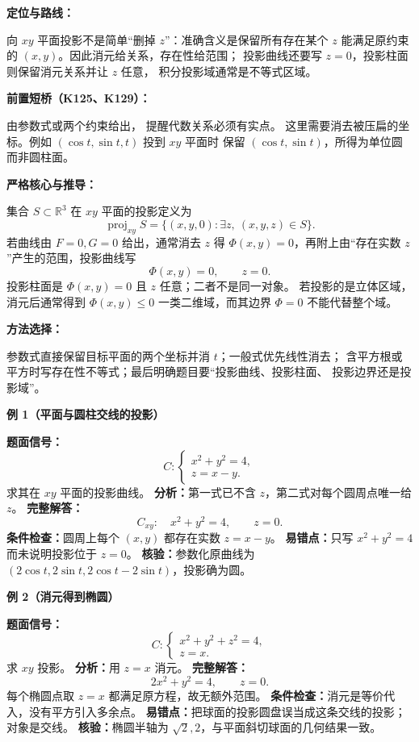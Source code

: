 \begin{knowledgeBox}
\textbf{定位与路线：}

向 \(xy\) 平面投影不是简单“删掉 \(z\)”：准确含义是保留所有存在某个
\(z\) 能满足原约束的 \((x,y)\)。因此消元给关系，存在性给范围；
投影曲线还要写 \(z=0\)，投影柱面则保留消元关系并让 \(z\) 任意，
积分投影域通常是不等式区域。

\textbf{前置短桥（K125、K129）：}

由参数式或两个约束给出，
提醒代数关系必须有实点。
这里需要消去被压扁的坐标。例如 \((\cos t,\sin t,t)\) 投到 \(xy\) 平面时
保留 \((\cos t,\sin t)\)，所得为单位圆而非圆柱面。

\textbf{严格核心与推导：}

集合 \(S\subset\mathbb R^3\) 在 \(xy\) 平面的投影定义为
\[
\operatorname{proj}_{xy}S
=\{(x,y,0):\exists z,\ (x,y,z)\in S\}.
\]
若曲线由 \(F=0,G=0\) 给出，通常消去 \(z\) 得
\(\Phi(x,y)=0\)，再附上由“存在实数 \(z\)”产生的范围，投影曲线写
\[
\Phi(x,y)=0,\qquad z=0.
\]
投影柱面是 \(\Phi(x,y)=0\) 且 \(z\) 任意；二者不是同一对象。
若投影的是立体区域，消元后通常得到
\(\Phi(x,y)\le0\) 一类二维域，而其边界 \(\Phi=0\) 不能代替整个域。

\textbf{方法选择：}

参数式直接保留目标平面的两个坐标并消 \(t\)；一般式优先线性消去；
含平方根或平方时写存在性不等式；最后明确题目要“投影曲线、投影柱面、
投影边界还是投影域”。

\textbf{例 1（平面与圆柱交线的投影）}

\textbf{题面信号：}
\[
C:\begin{cases}x^2+y^2=4,\\z=x-y.\end{cases}
\]
求其在 \(xy\) 平面的投影曲线。
\textbf{分析：}第一式已不含 \(z\)，第二式对每个圆周点唯一给 \(z\)。
\textbf{完整解答：}
\[
C_{xy}:\quad x^2+y^2=4,\qquad z=0.
\]
\textbf{条件检查：}圆周上每个 \((x,y)\) 都存在实数 \(z=x-y\)。
\textbf{易错点：}只写 \(x^2+y^2=4\) 而未说明投影位于 \(z=0\)。
\textbf{核验：}参数化原曲线为
\((2\cos t,2\sin t,2\cos t-2\sin t)\)，投影确为圆。

\textbf{例 2（消元得到椭圆）}

\textbf{题面信号：}
\[
C:\begin{cases}x^2+y^2+z^2=4,\\z=x.\end{cases}
\]
求 \(xy\) 投影。
\textbf{分析：}用 \(z=x\) 消元。
\textbf{完整解答：}
\[
2x^2+y^2=4,\qquad z=0.
\]
每个椭圆点取 \(z=x\) 都满足原方程，故无额外范围。
\textbf{条件检查：}消元是等价代入，没有平方引入多余点。
\textbf{易错点：}把球面的投影圆盘误当成这条交线的投影；对象是交线。
\textbf{核验：}椭圆半轴为 \(\sqrt2,2\)，与平面斜切球面的几何结果一致。


\end{knowledgeBox}
